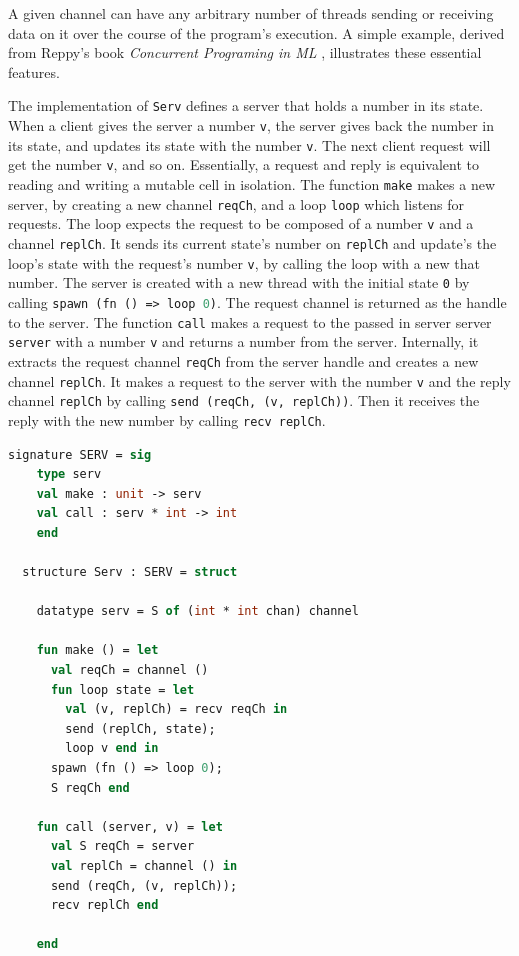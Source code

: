 \documentclass{article}
\begin{document}
A given channel can have any arbitrary number of threads sending or receiving data on it over
the course of the program's execution. A simple example, derived from Reppy's book
\textit{Concurrent Programing in ML} \cite{concurrent_ml}, illustrates these essential
features.

The implementation of \lstinline{Serv} defines a server that holds a number in its state.
When a client gives the server a number \lstinline{v}, the server gives back the number in
its state, and updates its state with the number \lstinline{v}.  The next client request will
get the number \lstinline{v}, and so on. Essentially, a request and reply is equivalent
to reading and writing a mutable cell in isolation. The function \lstinline{make} makes a new
server, by creating a new channel \lstinline{reqCh}, and a loop \lstinline{loop} which listens
for requests. The loop expects the request to be composed of a number \lstinline{v} and a
channel \lstinline{replCh}. It sends its current state's number on \lstinline{replCh} and
update's the loop's state with the request's number \lstinline{v}, by calling the loop with a
new that number. The server is created with a new thread with the initial state \lstinline{0}
by calling \lstinline[language=ML]{spawn (fn () => loop 0)}. The request channel is returned
as the handle to the server.  The function \lstinline{call} makes a request to the passed in
server server \lstinline{server} with a number \lstinline{v} and returns a number from the
server. Internally, it extracts the request channel \lstinline{reqCh} from the
server handle and creates a new channel \lstinline{replCh}. It makes a request to the server
with the number \lstinline{v} and the reply channel \lstinline{replCh} by calling
\lstinline{send (reqCh, (v, replCh))}. Then it receives the reply with the new number by
calling \lstinline{recv replCh}.


\begin{lstlisting}[language=ML, mathescape]
  signature SERV = sig 
    type serv
    val make : unit -> serv
    val call : serv * int -> int
    end

  structure Serv : SERV = struct 

    datatype serv = S of (int * int chan) channel 

    fun make () = let 
      val reqCh = channel ()
      fun loop state = let
        val (v, replCh) = recv reqCh in 
        send (replCh, state);
        loop v end in
      spawn (fn () => loop 0);
      S reqCh end 

    fun call (server, v) = let 
      val S reqCh = server
      val replCh = channel () in 
      send (reqCh, (v, replCh));
      recv replCh end

    end
  \end{lstlisting}
\end{document}
